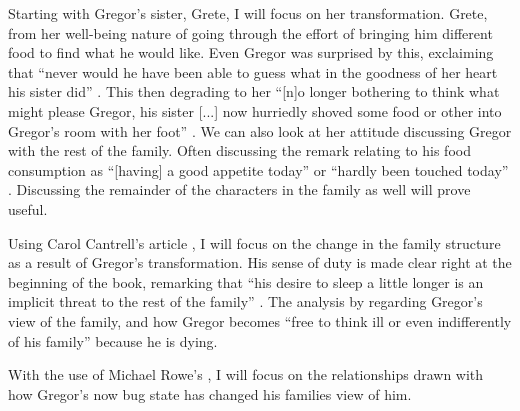 \documentclass{article}
\begin{document}
Starting with Gregor's sister, Grete, I will focus on her transformation.
Grete, from her well-being nature of going through the effort of bringing him
different food to find what he would like. Even Gregor was surprised by this,
exclaiming that ``never would he have been able to guess what in the
goodness of her heart his sister did'' \cite[109]{kafka2007meta}. This then
degrading to her ``[n]o longer bothering to think what might please Gregor,
his sister [...] now hurriedly shoved some food or other into Gregor's room
with her foot'' \cite[130]{kafka2007meta}. We can also look at her attitude
discussing Gregor with the rest of the family. Often discussing the remark
relating to his food consumption as ``[having] a good appetite today'' or
``hardly been touched today'' \cite[111, 111]{kafka2007meta}. Discussing the
remainder of the characters in the family as well will prove useful.

Using Carol Cantrell's article , I will focus on
the change in the family structure as a result of Gregor's transformation.
His sense of duty is made clear right at the beginning of the book,
\citeauthor{cantrellFamily} remarking that ``his desire to sleep a little
longer is an implicit threat to the rest of the family''
\cite[581]{cantrellFamily}. The analysis by \citeauthor{cantrellFamily}
regarding Gregor's view of the family, and how Gregor becomes ``free to
think ill or even indifferently of his family'' \cite[585]{cantrellFamily}
because he is dying.

With the use of Michael Rowe's , I will focus on the
relationships drawn with how Gregor's now bug state has changed his families
view of him.

\makeworkscited
\end{document}
